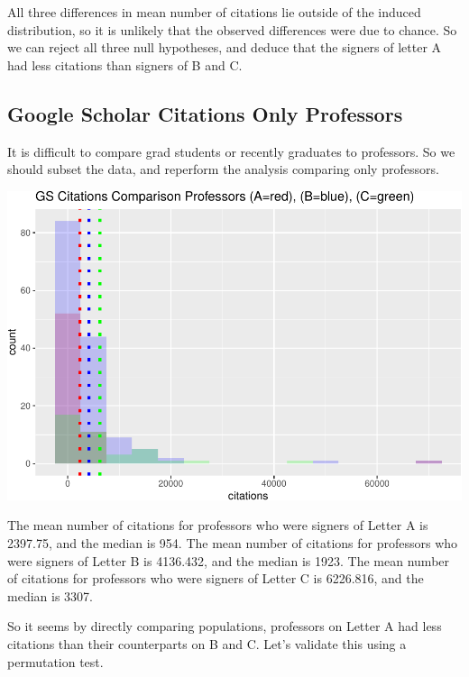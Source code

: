 \documentclass[]{article}
\begin{document}
All three differences in mean number of citations lie outside of the
induced distribution, so it is unlikely that the observed differences
were due to chance. So we can reject all three null hypotheses, and
deduce that the signers of letter A had less citations than signers of B
and C.

\hypertarget{google-scholar-citations-only-professors}{%
\subsection{Google Scholar Citations Only
Professors}\label{google-scholar-citations-only-professors}}

It is difficult to compare grad students or recently graduates to
professors. So we should subset the data, and reperform the analysis
comparing only professors.

\includegraphics{final_files/figure-latex/unnamed-chunk-59-1.pdf}

The mean number of citations for professors who were signers of Letter A
is 2397.75, and the median is 954. The mean number of citations for
professors who were signers of Letter B is 4136.432, and the median is
1923. The mean number of citations for professors who were signers of
Letter C is 6226.816, and the median is 3307.

So it seems by directly comparing populations, professors on Letter A
had less citations than their counterparts on B and C. Let's validate
this using a permutation test.
\end{document}
